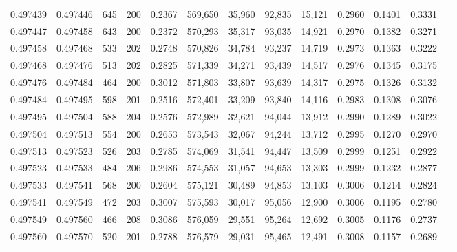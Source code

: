 \begin{tabular}{rrrrrrrrrrrrr}
0.497439 & 0.497446 &   645 & 200 &                                     0.2367 & 569,650 &  35,960 &  92,835 &  15,121 & 0.2960 & 0.1401 & 0.3331 \\
0.497447 & 0.497458 &   643 & 200 &                                     0.2372 & 570,293 &  35,317 &  93,035 &  14,921 & 0.2970 & 0.1382 & 0.3271 \\
0.497458 & 0.497468 &   533 & 202 &                                     0.2748 & 570,826 &  34,784 &  93,237 &  14,719 & 0.2973 & 0.1363 & 0.3222 \\
0.497468 & 0.497476 &   513 & 202 &                                     0.2825 & 571,339 &  34,271 &  93,439 &  14,517 & 0.2976 & 0.1345 & 0.3175 \\
0.497476 & 0.497484 &   464 & 200 &                                     0.3012 & 571,803 &  33,807 &  93,639 &  14,317 & 0.2975 & 0.1326 & 0.3132 \\
0.497484 & 0.497495 &   598 & 201 &                                     0.2516 & 572,401 &  33,209 &  93,840 &  14,116 & 0.2983 & 0.1308 & 0.3076 \\
0.497495 & 0.497504 &   588 & 204 &                                     0.2576 & 572,989 &  32,621 &  94,044 &  13,912 & 0.2990 & 0.1289 & 0.3022 \\
0.497504 & 0.497513 &   554 & 200 &                                     0.2653 & 573,543 &  32,067 &  94,244 &  13,712 & 0.2995 & 0.1270 & 0.2970 \\
0.497513 & 0.497523 &   526 & 203 &                                     0.2785 & 574,069 &  31,541 &  94,447 &  13,509 & 0.2999 & 0.1251 & 0.2922 \\
0.497523 & 0.497533 &   484 & 206 &                                     0.2986 & 574,553 &  31,057 &  94,653 &  13,303 & 0.2999 & 0.1232 & 0.2877 \\
0.497533 & 0.497541 &   568 & 200 &                                     0.2604 & 575,121 &  30,489 &  94,853 &  13,103 & 0.3006 & 0.1214 & 0.2824 \\
0.497541 & 0.497549 &   472 & 203 &                                     0.3007 & 575,593 &  30,017 &  95,056 &  12,900 & 0.3006 & 0.1195 & 0.2780 \\
0.497549 & 0.497560 &   466 & 208 &                                     0.3086 & 576,059 &  29,551 &  95,264 &  12,692 & 0.3005 & 0.1176 & 0.2737 \\
0.497560 & 0.497570 &   520 & 201 &                                     0.2788 & 576,579 &  29,031 &  95,465 &  12,491 & 0.3008 & 0.1157 & 0.2689 \\

\end{tabular}
